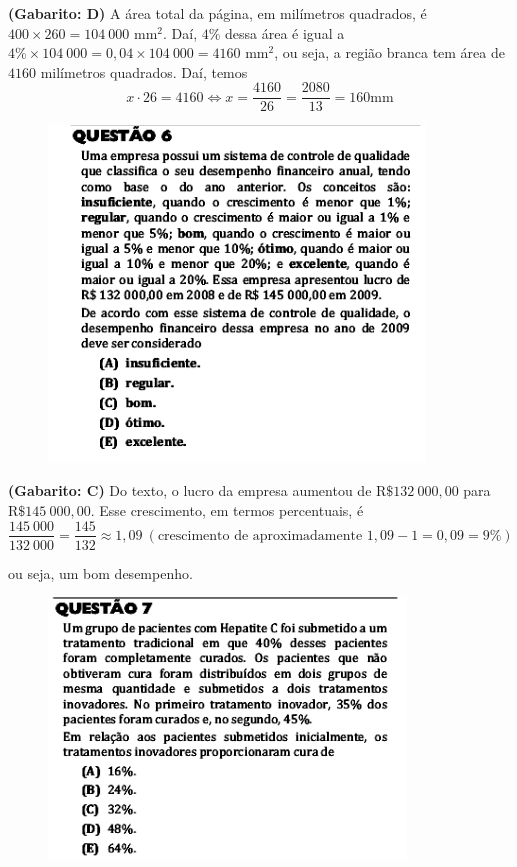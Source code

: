 \documentclass[a4paper]{article}
\begin{document}
\par\textbf{(Gabarito: D)} A área total da página, em milímetros quadrados, é $400\times 260 = 104\ 000\text{ mm}^2$. Daí, $4\%$ dessa área é igual a $4\%\times 104\ 000 = 0,04\times 104\ 000 = 4160\text{ mm}^2$, ou seja, a região branca tem área de $4160$ milímetros quadrados.
Daí, temos
\begin{equation*}
x\cdot 26 = 4160 \iff x = \frac{4160}{26} = \frac{2080}{13} = 160\text{mm}
\end{equation*}
\begin{figure}[H]
	\begin{center}
		\includegraphics[width=10cm]{L3Q6.png}
	\end{center}
\end{figure}
\par\textbf{(Gabarito: C)} Do texto, o lucro da empresa aumentou de $\text{R\$}132\ 000,00$ para $\text{R\$}145\ 000,00$. Esse crescimento, em termos percentuais, é
\begin{equation*}
\frac{145\ 000}{132\ 000} = \frac{145}{132} \approx 1,09 \ (\text{crescimento de aproximadamente }1,09-1 = 0,09 = 9\%)
\end{equation*}
\par\vspace{0.3cm} ou seja, um bom desempenho.
\begin{figure}[H]
	\begin{center}
		\includegraphics[width=9.5cm]{L3Q7.png}
	\end{center}
\end{figure}
\end{document}
